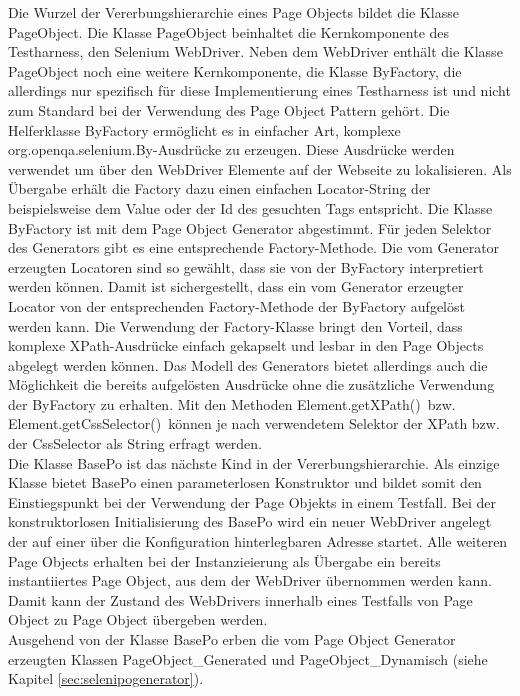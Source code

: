Die Wurzel der Vererbungshierarchie eines Page Objects bildet die Klasse PageObject. Die Klasse PageObject beinhaltet die Kernkomponente des Testharness, den Selenium WebDriver. Neben dem WebDriver enthält die Klasse PageObject noch eine weitere Kernkomponente, die Klasse ByFactory, die allerdings nur spezifisch für diese Implementierung eines Testharness ist und nicht zum Standard bei der Verwendung des Page Object Pattern gehört.
Die Helferklasse ByFactory ermöglicht es in einfacher Art, komplexe \grq org.openqa.selenium.By\grq -Ausdrücke zu erzeugen. Diese Ausdrücke werden verwendet um über den WebDriver Elemente auf der Webseite zu lokalisieren. Als Übergabe erhält die Factory dazu einen einfachen Locator-String der beispielsweise dem Value oder der Id des gesuchten Tags entspricht. Die Klasse ByFactory ist mit dem Page Object Generator abgestimmt. Für jeden Selektor des Generators gibt es eine entsprechende Factory-Methode. Die vom Generator erzeugten Locatoren sind so gewählt, dass sie von der ByFactory interpretiert werden können. Damit ist sichergestellt, dass ein vom Generator erzeugter Locator von der entsprechenden Factory-Methode der ByFactory aufgelöst werden kann.
Die Verwendung der Factory-Klasse bringt den Vorteil, dass komplexe XPath-Ausdrücke einfach gekapselt und lesbar in den Page Objects abgelegt werden können.
Das Modell des Generators bietet allerdings auch die Möglichkeit die bereits aufgelösten Ausdrücke ohne die zusätzliche Verwendung der ByFactory zu erhalten.
Mit den Methoden  \grq Element.getXPath()\grq\ bzw.  \grq Element.getCssSelector()\grq\ können je nach verwendetem Selektor der XPath bzw. der CssSelector als String erfragt werden. \\
Die Klasse BasePo ist das nächste Kind in der Vererbungshierarchie. Als einzige Klasse bietet BasePo einen parameterlosen Konstruktor und bildet somit den Einstiegspunkt bei der Verwendung der Page Objekts in einem Testfall. Bei der konstruktorlosen Initialisierung des BasePo wird ein neuer WebDriver angelegt der auf einer über die Konfiguration hinterlegbaren Adresse startet.
Alle weiteren Page Objects erhalten bei der Instanzieierung als Übergabe ein bereits instantiiertes Page Object, aus dem der WebDriver übernommen werden kann.
Damit kann der Zustand des WebDrivers innerhalb eines Testfalls von Page Object zu Page Object übergeben werden.\\
Ausgehend von der Klasse BasePo erben die vom Page Object Generator erzeugten Klassen PageObject\_Generated und PageObject\_Dynamisch (siehe Kapitel \ref{sec:selenipogenerator}).
